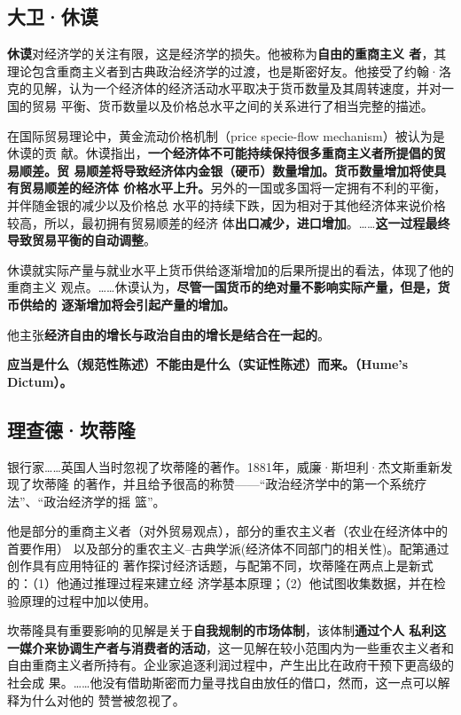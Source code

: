 \subsection{大卫·休谟}

\textbf{休谟}对经济学的关注有限，这是经济学的损失。他被称为\textbf{自由的重商主义
  者}，其理论包含重商主义者到古典政治经济学的过渡，也是斯密好友。他接受了约翰·洛
克的见解，认为一个经济体的经济活动水平取决于货币数量及其周转速度，并对一国的贸易
平衡、货币数量以及价格总水平之间的关系进行了相当完整的描述。

在国际贸易理论中，黄金流动价格机制（price specie-flow mechanism）被认为是休谟的贡
献。休谟指出，\textbf{一个经济体不可能持续保持很多重商主义者所提倡的贸易顺差。贸
  易顺差将导致经济体内金银（硬币）数量增加。货币数量增加将使具有贸易顺差的经济体
  价格水平上升。}另外的一国或多国将一定拥有不利的平衡，并伴随金银的减少以及价格总
水平的持续下跌，因为相对于其他经济体来说价格较高，所以，最初拥有贸易顺差的经济
体\textbf{出口减少，进口增加}。……\textbf{这一过程最终导致贸易平衡的自动调整}。

休谟就实际产量与就业水平上货币供给逐渐增加的后果所提出的看法，体现了他的重商主义
观点。……休谟认为，\textbf{尽管一国货币的绝对量不影响实际产量，但是，货币供给的
  逐渐增加将会引起产量的增加。}

他主张\textbf{经济自由的增长与政治自由的增长是结合在一起的}。

\textbf{应当是什么（规范性陈述）不能由是什么（实证性陈述）而来。（Hume's
  Dictum）。}

\subsection{理查德·坎蒂隆}

银行家……英国人当时忽视了坎蒂隆的著作。1881年，威廉·斯坦利·杰文斯重新发现了坎蒂隆
的著作，并且给予很高的称赞——“政治经济学中的第一个系统疗法”、“政治经济学的摇
篮”。

他是部分的重商主义者（对外贸易观点），部分的重农主义者（农业在经济体中的首要作用）
以及部分的重农主义--古典学派(经济体不同部门的相关性)。配第通过创作具有应用特征的
著作探讨经济话题，与配第不同，坎蒂隆在两点上是新式的：（1）他通过推理过程来建立经
济学基本原理；（2）他试图收集数据，并在检验原理的过程中加以使用。

坎蒂隆具有重要影响的见解是关于\textbf{自我规制的市场体制}，该体制\textbf{通过个人
  私利这一媒介来协调生产者与消费者的活动}，这一见解在较小范围内为一些重农主义者和
自由重商主义者所持有。企业家追逐利润过程中，产生出比在政府干预下更高级的社会成
果。……他没有借助斯密而力量寻找自由放任的借口，然而，这一点可以解释为什么对他的
赞誉被忽视了。

